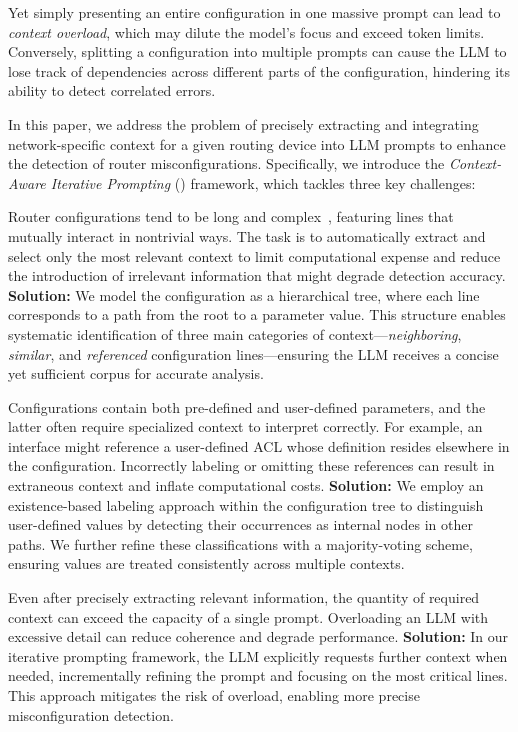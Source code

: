 Yet simply presenting an entire configuration in one massive prompt can lead
to \emph{context overload}, which may dilute the model's focus and exceed token
limits. Conversely, splitting a configuration into multiple prompts can cause
the LLM to lose track of dependencies across different parts of the
configuration, hindering its ability to detect correlated errors.

In this paper, we address the problem of precisely extracting and integrating
network-specific context for a given routing device into LLM prompts to enhance
the detection of router misconfigurations. Specifically, we introduce the
\emph{Context-Aware Iterative Prompting} (\sysname{}) framework, which tackles
three key challenges:

 Router
configurations tend to be long and
complex~\cite{benson2009complexitymetrics}, featuring lines that mutually
interact in nontrivial ways. The task is to automatically extract and select
only the most relevant context to limit computational expense and reduce the
introduction of irrelevant information that might degrade detection accuracy.
\textbf{Solution:} We model the configuration as a hierarchical tree, where
each line corresponds to a path from the root to a parameter value. This
structure enables systematic identification of three main categories of
context---\emph{neighboring}, \emph{similar}, and \emph{referenced}
configuration lines—ensuring the LLM receives a concise yet sufficient corpus
for accurate analysis.

Configurations contain both pre-defined and user-defined parameters, and the
latter often require specialized context to interpret correctly. For example,
an interface might reference a user-defined ACL whose definition resides
elsewhere in the configuration. Incorrectly labeling or omitting these
references can result in extraneous context and inflate computational costs.
\textbf{Solution:} We employ an existence-based labeling approach within the
configuration tree to distinguish user-defined values by detecting their
occurrences as internal nodes in other paths. We further refine these
classifications with a majority-voting scheme, ensuring values are treated
consistently across multiple contexts.

 Even after
precisely extracting relevant information, the quantity of required context
can exceed the capacity of a single prompt. Overloading an LLM with excessive
detail can reduce coherence and degrade performance. \textbf{Solution:} In our
iterative prompting framework, the LLM explicitly requests further context
when needed, incrementally refining the prompt and focusing on the most
critical lines. This approach mitigates the risk of overload, enabling more
precise misconfiguration detection.

